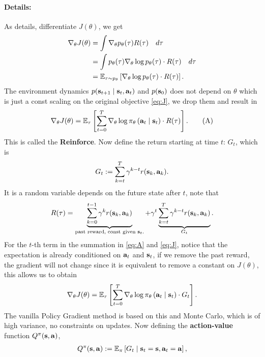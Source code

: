\documentclass[11pt]{article}  %
\begin{document}
\paragraph{Details:}
As details, differentiate $J(\theta)$, we get 
\begin{align*}
  \nabla_{\theta} J(\theta) &= \int \nabla_\theta p_\theta(\tau) R(\tau) \quad d\tau \\
  &= \int p_\theta(\tau) \nabla_{\theta} \log p_{\theta}(\tau) \cdot R(\tau) \quad d\tau \\
  &= \mathbb{E}_{\tau \sim p_\theta}\left[\nabla_\theta\log p_{\theta}(\tau)\cdot R(\tau)\right].
\end{align*}
The environment dynamics $p(\mathbf{s}_{t+1}\mid \mathbf{s}_t, \mathbf{a}_t)$ and $p(\mathbf{s}_0)$ does not depend on $\theta$ which is just a const scaling on the original objective \eqref{eq:J}, we drop them and result in
\begin{align}
  \label{eq:A}
  \nabla_{\theta} J(\theta) = \mathbb{E}_{\tau}\left[\sum_{t=0}^{T}\nabla_\theta \log \pi_{\theta}\left( \mathbf{a}_t \mid \mathbf{s}_t \right) \cdot R(\tau)\right]. \tag{A}
\end{align}
This is called the \textbf{Reinforce}.
Now define the return starting at time $t$: $G_t$, which is 
\begin{align*}
  G_t := \sum_{k=t}^{T}\gamma^{k - t}r(\mathbf{s}_k, \mathbf{a}_k).
\end{align*}
It is a random variable depends on the future state after $t$, note that 
\begin{align*}
  R(\tau) = \underbrace{\sum_{k=0}^{t-1}\gamma^k r(\mathbf{s}_k, \mathbf{a}_k)}_{\text{past reward, const given $\mathbf{s}_t$.}} + \gamma^t\underbrace{\sum_{k=t}^{T}\gamma^{k-t}r(\mathbf{s}_k, \mathbf{a}_k)}_{G_t}.
\end{align*}
For the $t$-th term in the summation in \eqref{eq:A} and \eqref{eq:J}, notice that the expectation is already conditioned on $\mathbf{a}_t$ and $\mathbf{s}_t$, if we remove the past reward, the gradient will not change since it is equivalent to remove a constant on $J(\theta)$, this allows us to obtain 
\begin{align}
  \label{eq:JG}
  \nabla_{\theta} J(\theta) = \mathbb{E}_{\tau}\left[\sum_{t=0}^{T}\nabla_\theta \log \pi_{\theta}\left( \mathbf{a}_t \mid \mathbf{s}_t \right) \cdot G_t\right].
\end{align}
The vanilla Policy Gradient method is based on this and Monte Carlo, which is of high variance, no constraints on updates.
Now defining the \textbf{action-value} function $Q^{\pi}(\mathbf{s}, \mathbf{a})$,
\begin{align*}
  Q^{\pi}(\mathbf{s}, \mathbf{a}) := \mathbb{E}_{\pi}\left[G_t \mid \mathbf{s}_t = \mathbf{s}, \mathbf{a}_t = \mathbf{a}\right],
\end{align*}
\end{document}
